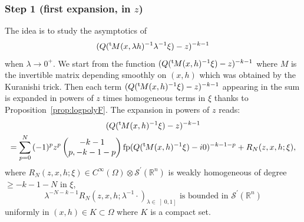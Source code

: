 \documentclass[10pt]{amsart}
\let\pazocal\mathscr
\theoremstyle{definition}
\DeclareMathOperator*{\pf}{fp}
\newcommand{\opencl}[1]{\mathopen{}\mathclose{\left]#1 \right]}}
\newcommand{\step}[1]{\subsubsection*{Step #1}}
\renewcommand{\t}{{{}^{\mathrm{t}\mkern-2mu}}}
\begin{document}
\step{1 (first expansion, in $z$)}
The idea is to study the asymptotics
of
\[
(Q(\t M(x,\lambda h)^{-1}\lambda^{-1}\xi)-z)^{-k-1}
\]
when $\lambda\to 0^+$.
We start from the function
$(Q(\t M(x,h)^{-1}\xi)-{z})^{-k-1} $ where $M$ is the invertible matrix
depending smoothly on $(x,h)$ which was obtained by the Kuranishi trick.
Then each term $(Q(\t M(x,h)^{-1}\xi)-z)^{-k-1} $
appearing in the sum is expanded in powers of $z$ times homogeneous terms in $\xi$
{thanks to Proposition~\ref{prop:logpolyF}}.
The expansion in powers of $z$ reads:
\begin{multline*}
(Q(\t M(x, h)^{-1}\xi)-z)^{-k-1}\\
=\sum_{p=0}^N {(-1)^p} z^p \begin{pmatrix}
-k-1\\
p,-k-1-p
\end{pmatrix}
\pf(Q(\t M(x, h)^{-1}\xi)-i0)^{-k-1-p} +R_N(z,x,h;\xi),
\end{multline*}
where $R_N(z,x,h;\xi)\in C^\infty(\Omega)\otimes \pazocal{S}^\prime(\mathbb{R}^n)$ is weakly homogeneous of degree $\geqslant -k-1-N$ in $\xi$, \ie
\[
\lambda^{-N-k-1}R_N(z,x,h;\lambda^{-1}\cdot)_{\lambda\in \opencl{0,1}} \text{ is bounded in }\pazocal{S}^\prime(\mathbb{R}^n)
\]
uniformly in $(x,h)\in K\subset \Omega$ where $K$ is a compact set.
\end{document}
